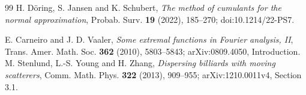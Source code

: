 \begin{thebibliography}{99}
 H. D\"oring, S. Jansen and K. Schubert,
\emph{The method of cumulants for the normal approximation},
Probab. Surv. \textbf{19} (2022), 185--270; doi:10.1214/22-PS7.

 E. Carneiro and J. D. Vaaler,
\emph{Some extremal functions in Fourier analysis, II},
Trans. Amer. Math. Soc. \textbf{362} (2010), 5803--5843;
arXiv:0809.4050, Introduction.
 M. Stenlund, L.-S. Young and H. Zhang,
\emph{Dispersing billiards with moving scatterers},
Comm. Math. Phys. \textbf{322} (2013), 909--955;
arXiv:1210.0011v4, Section 3.1.
\end{thebibliography}
